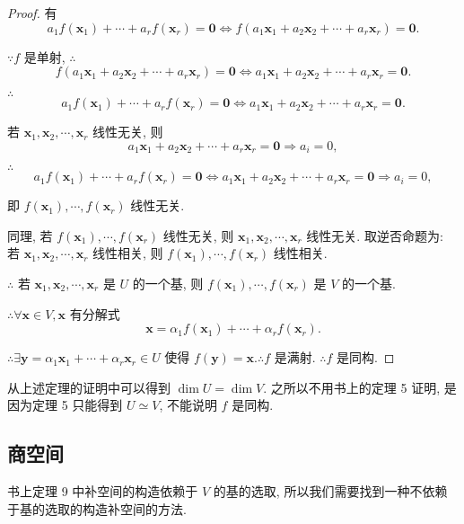 \documentclass[color=black,device=normal,lang=cn,mode=geye]{elegantnote}
\begin{document}
\begin{proof}
    有
    \[a_1f(\boldsymbol{x}_1)+\cdots+a_rf(\boldsymbol{x}_r)=\boldsymbol{0}\Leftrightarrow f(a_1\boldsymbol{x}_1+a_2\boldsymbol{x}_2+\cdots+a_r\boldsymbol{x}_r)=\boldsymbol{0}.\]

    $\because f$ 是单射, $\therefore$
    \[f(a_1\boldsymbol{x}_1+a_2\boldsymbol{x}_2+\cdots+a_r\boldsymbol{x}_r)=\boldsymbol{0}\Leftrightarrow a_1\boldsymbol{x}_1+a_2\boldsymbol{x}_2+\cdots+a_r\boldsymbol{x}_r=\boldsymbol{0}.\]

    $\therefore$
    \[a_1f(\boldsymbol{x}_1)+\cdots+a_rf(\boldsymbol{x}_r)=\boldsymbol{0}\Leftrightarrow a_1\boldsymbol{x}_1+a_2\boldsymbol{x}_2+\cdots+a_r\boldsymbol{x}_r=\boldsymbol{0}.\]
    
    若 $\boldsymbol{x}_1,\boldsymbol{x}_2,\cdots,\boldsymbol{x}_r$ 线性无关, 则
    \[a_1\boldsymbol{x}_1+a_2\boldsymbol{x}_2+\cdots+a_r\boldsymbol{x}_r=\boldsymbol{0}\Rightarrow a_i=0,\]

    $\therefore$
    \[a_1f(\boldsymbol{x}_1)+\cdots+a_rf(\boldsymbol{x}_r)=\boldsymbol{0}\Leftrightarrow a_1\boldsymbol{x}_1+a_2\boldsymbol{x}_2+\cdots+a_r\boldsymbol{x}_r=\boldsymbol{0}\Rightarrow a_i=0,\]

    即 $f(\boldsymbol{x}_1),\cdots,f(\boldsymbol{x}_r)$ 线性无关.

    同理, 若 $f(\boldsymbol{x}_1),\cdots,f(\boldsymbol{x}_r)$ 线性无关, 则 $\boldsymbol{x}_1,\boldsymbol{x}_2,\cdots,\boldsymbol{x}_r$ 线性无关. 取逆否命题为: 若 $\boldsymbol{x}_1,\boldsymbol{x}_2,\cdots,\boldsymbol{x}_r$ 线性相关, 则 $f(\boldsymbol{x}_1),\cdots,f(\boldsymbol{x}_r)$ 线性相关.

    $\therefore$ 若 $\boldsymbol{x}_1,\boldsymbol{x}_2,\cdots,\boldsymbol{x}_r$ 是 $U$ 的一个基, 则 $f(\boldsymbol{x}_1),\cdots,f(\boldsymbol{x}_r)$ 是 $V$ 的一个基.

    $\therefore\forall\boldsymbol{x}\in V,\boldsymbol{x}$ 有分解式
    \[\boldsymbol{x}=\alpha_1f(\boldsymbol{x}_1)+\cdots+\alpha_rf(\boldsymbol{x}_r).\]

    $\therefore\exists\boldsymbol{y}=\alpha_1\boldsymbol{x}_1+\cdots+\alpha_r\boldsymbol{x}_r\in U$ 使得 $f(\boldsymbol{y})=\boldsymbol{x}.\therefore f$ 是满射. $\therefore f$ 是同构.
\end{proof}
\begin{note}
    从上述定理的证明中可以得到 $\dim U=\dim V$. 之所以不用书上的定理 5 证明, 是因为定理 5 只能得到 $U\simeq V$, 不能说明 $f$ 是同构.
\end{note}
\subsection{商空间}
书上定理 9 中补空间的构造依赖于 $V$ 的基的选取, 所以我们需要找到一种不依赖于基的选取的构造补空间的方法.
\end{document}
